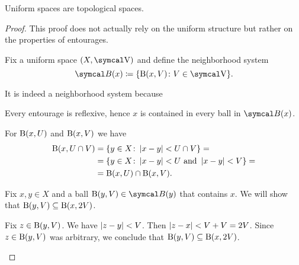 \begin{proposition}\label{thm:uniform_spaces_are_topological}
  Uniform spaces are topological spaces.
\end{proposition}
\begin{proof}
  This proof does not actually rely on the uniform structure but rather on the properties of entourages.

  Fix a uniform space \( (X, \V) \) and define the neighborhood system
  \begin{equation*}
    \Cal{B}(x) \coloneqq \{ \B(x, V) \colon V \in \V \}.
  \end{equation*}

  It is indeed a neighborhood system because
  \begin{description}
     Every entourage is reflexive, hence \( x \) is contained in every ball in \( \Cal{B}(x) \).

     For \( \operatorname{B}(x, U) \) and \( \operatorname{B}(x, V) \) we have
    \begin{align*}
      \operatorname{B}(x, U \cap V)
      &=
      \{ y \in X \colon \left\vert x - y \right\vert < U \cap V \}
      = \\ &=
      \{ y \in X \colon \left\vert x - y \right\vert < U \text{ and } \left\vert x - y \right\vert < V \}
      = \\ &=
      \operatorname{B}(x, U) \cap \operatorname{B}(x, V).
    \end{align*}

     Fix \( x, y \in X \) and a ball \( \B(y, V) \in \Cal{B}(y) \) that contains \( x \). We will show that \( \operatorname{B}(y, V) \subseteq \operatorname{B}(x, 2V) \).

    Fix \( z \in \operatorname{B}(y, V) \). We have \( \left\vert z - y \right\vert < V \). Then \( \left\vert z - x \right\vert < V + V = 2V \). Since \( z \in \operatorname{B}(y, V) \) was arbitrary, we conclude that \( \operatorname{B}(y, V) \subseteq \operatorname{B}(x, 2V) \).
  \end{description}
\end{proof}

